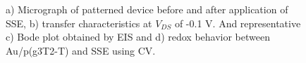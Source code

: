 \begin{figure}[ht]
    \centering
    \hspace{2em}
    \qquad
    \caption[Performance of solid-OECT with photolithographed SSE]{a) Micrograph of patterned device before and after application of SSE, b) transfer characteristics at $V_{DS}$ of -0.1 V. And representative c) Bode plot obtained by EIS and d) redox behavior between Au/p(g3T2-T) and SSE using CV.}
    \label{fig:photoSSE}
\end{figure}

